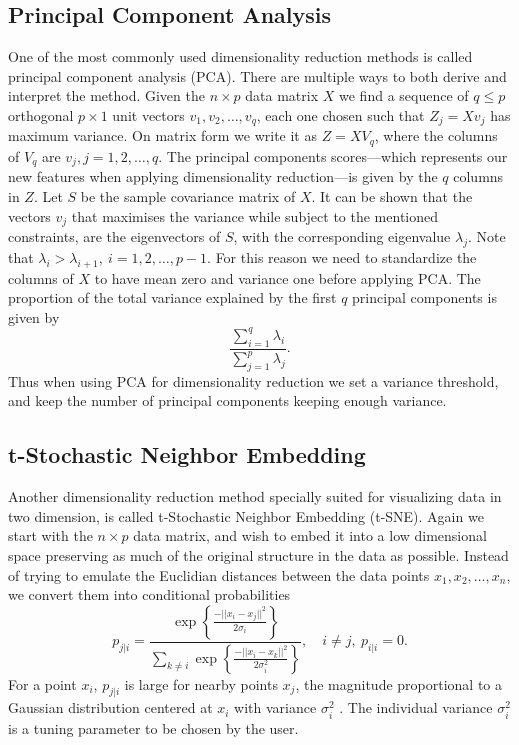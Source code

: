 \documentclass[a4paper]{memoir}
\theoremstyle{plain}
\theoremstyle{definition}
\theoremstyle{remark}
\begin{document}
\subsection{Principal Component Analysis}\label{sec:pca}
One of the most commonly used dimensionality reduction methods is called principal component analysis (PCA).
There are multiple ways to both derive and interpret the method.
Given the $n \times p$ data matrix $X$ we find a sequence of $q \leq p$ orthogonal $p \times 1$ unit vectors $v_1, v_2, \hdots, v_q$, each one chosen such that $Z_j = Xv_j$ has maximum variance.
On matrix form we write it as $Z = X V_q$, where the columns of $V_q$ are $v_j, j = 1, 2, \hdots, q$. 
The principal components scores—which represents our new features when applying dimensionality reduction—is given by the $q$ columns in $Z$.
Let $S$ be the sample covariance matrix of $X$.
It can be shown \cite{jolliffe} that the vectors $v_j$ that maximises the variance while subject to the mentioned constraints, are the eigenvectors of $S$, with the corresponding eigenvalue $\lambda_j$. Note that $\lambda_i > \lambda_{i+1},\ i = 1, 2, \hdots, p-1$.
For this reason we need to standardize the columns of $X$ to have mean zero and variance one before applying PCA.
The proportion of the total variance explained by the first $q$ principal components is given by
\begin{equation*}
        \frac{\sum_{i = 1}^{q}\lambda_i}{\sum_{j = 1}^{p} \lambda_j}.
\end{equation*}
Thus when using PCA for dimensionality reduction we set a variance threshold, and keep the number of principal components keeping enough variance.



\subsection{t-Stochastic Neighbor Embedding}\label{sec:tsne}
Another dimensionality reduction method specially suited for visualizing data in two dimension, is called t-Stochastic Neighbor Embedding (t-SNE).
Again we start with the $n \times p$ data matrix, and wish to embed it into a low dimensional space preserving as much of the original structure in the data as possible.
Instead of trying to emulate the Euclidian distances between the data points $x_1, x_2, \hdots, x_n$, we convert them into conditional probabilities 
\begin{equation}\label{eq:gaus}
       p_{j|i} = \frac{\exp \left\{ \frac{-||x_i - x_j||^2}{2\sigma_i} \right\}}{\sum_{k \neq i}^{} \exp \left\{ \frac{-||x_i - x_k||^2}{2\sigma_i^2} \right\}}, \quad i \neq j, \ p_{i|i} = 0. 
\end{equation}
For a point $x_i$, $p_{j|i}$ is large for nearby points $x_j$, the magnitude proportional to a Gaussian distribution centered at $x_i$ with variance $\sigma_i^2$ \cite{hinton}.
The individual variance $\sigma_i^2$ is a tuning parameter to be chosen by the user.
\end{document}
